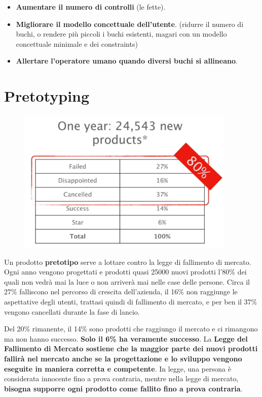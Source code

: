 \documentclass[a4paper,11pt,oneside]{book}
\begin{document}
\begin{itemize}
	\item \textbf{Aumentare il numero di controlli} (le fette).
	\item \textbf{Migliorare il modello concettuale dell'utente}. (ridurre il numero di buchi, o rendere più piccoli i buchi esistenti, magari con un modello concettuale minimale e dei constraints)
	\item \textbf{Allertare l'operatore umano quando diversi buchi si allineano}.
\end{itemize}

\pagebreak

\chapter{Pretotyping}
\begin{figure}[!h]
	\centering
	\includegraphics[scale=0.5]{immagini/Fall_mercato.png}
\end{figure}
Un prodotto \textbf{pretotipo} serve a lottare contro la legge di fallimento di mercato. Ogni anno vengono progettati e prodotti quasi 25000 nuovi prodotti l'80\% dei quali non vedrà mai la luce o non arriverà mai nelle case delle persone. Circa il 27\%
falliscono nel percorso di crescita dell'azienda, il 16\% non raggiunge le aspettative degli utenti, trattasi quindi di fallimento di mercato, e per ben il 37\% vengono cancellati durante la fase di lancio.

Del 20\% rimanente, il 14\% sono prodotti che raggiungo il mercato e ci rimangono ma
non hanno successo. \textbf{Solo il 6\% ha veramente successo}. La
\textbf{Legge del Fallimento di Mercato sostiene che la maggior parte dei nuovi prodotti fallirà nel mercato anche se la progettazione e lo sviluppo vengono eseguite in maniera corretta e competente}.
In legge, una persona è considerata innocente fino a prova contraria, mentre nella legge di mercato, \textbf{bisogna supporre ogni prodotto come fallito fino a prova contraria}.
\end{document}
